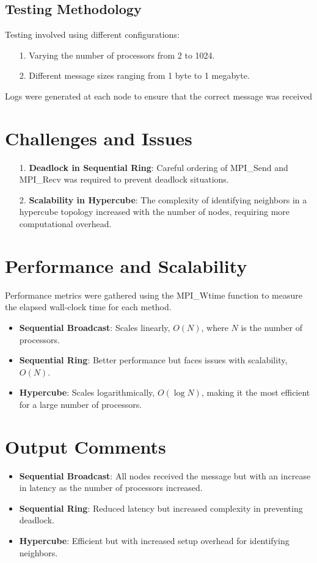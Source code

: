 \documentclass[11pt]{article}
\begin{document}
\subsection{Testing Methodology}

Testing involved using different configurations:
\begin{itemize}
    \item [1.] Varying the number of processors from 2 to 1024.
    \item [2.] Different message sizes ranging from 1 byte to 1 megabyte.
\end{itemize}
Logs were generated at each node to ensure that the correct message was received

\section{Challenges and Issues}
\begin{itemize}
    \item [1.] \textbf{Deadlock in Sequential Ring}: Careful ordering of MPI\_Send and MPI\_Recv was required to prevent deadlock situations.
    \item [2.] \textbf{Scalability in Hypercube}: The complexity of identifying neighbors in a hypercube topology increased with the number of nodes, requiring more computational overhead.
\end{itemize}

\section{Performance and Scalability}

Performance metrics were gathered using the MPI\_Wtime function to measure the elapsed wall-clock time for each method.

\begin{itemize}
    \item \textbf{Sequential Broadcast}: Scales linearly, $O(N)$, where $N$ is the number of processors.
    \item \textbf{Sequential Ring}: Better performance but faces issues with scalability, $O(N)$.
    \item \textbf{Hypercube}: Scales logarithmically, $O(\log N)$, making it the most efficient for a large number of processors.
\end{itemize}

\section{Output Comments}

\begin{itemize}
    \item \textbf{Sequential Broadcast}: All nodes received the message but with an increase in latency as the number of processors increased.
    \item \textbf{Sequential Ring}: Reduced latency but increased complexity in preventing deadlock.
    \item \textbf{Hypercube}: Efficient but with increased setup overhead for identifying neighbors.
\end{itemize}
\end{document}

